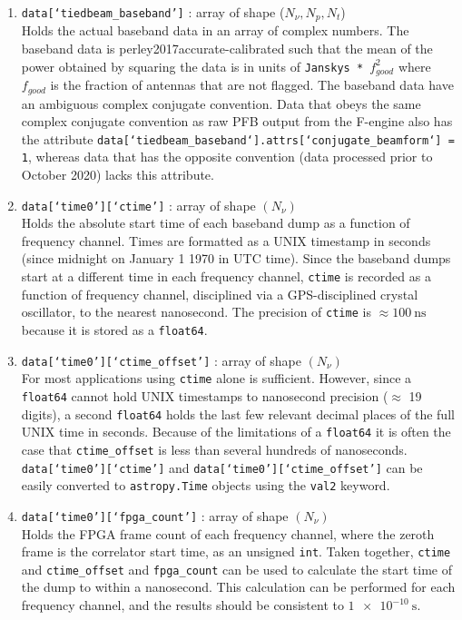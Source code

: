 \begin{enumerate}
    \item \texttt{data[`tiedbeam\_baseband']} : array of shape ($N_{\nu},N_{p}, N_t$)\\ 
            Holds the actual baseband data in an array of complex numbers. The baseband data is perley2017accurate-calibrated such that the mean of the power obtained by squaring the data is in units of \texttt{Janskys * $f_{good}^2$} where $f_{good}$ is the fraction of antennas that are not flagged. The baseband data have an ambiguous complex conjugate convention. Data that obeys the same complex conjugate convention as raw PFB output from the F-engine also has the attribute \texttt{data[`tiedbeam\_baseband`].attrs[`conjugate\_beamform`] = 1}, whereas data that has the opposite convention (data processed prior to October 2020) lacks this attribute.

    \item \texttt{data[`time0'][`ctime']} : array of shape $(N_{\nu})$ \\
        Holds the absolute start time of each baseband dump as a function of frequency channel. Times are formatted as a UNIX timestamp in seconds (since midnight on January 1 1970 in UTC time). Since the baseband dumps start at a different time in each frequency channel, \texttt{ctime} is recorded as a function of frequency channel, disciplined via a GPS-disciplined crystal oscillator, to the nearest nanosecond. The precision of \texttt{ctime} is $\approx \SI{100}{\ns}$ because it is stored as a \texttt{float64}.

    \item \texttt{data[`time0'][`ctime\_offset']} : array of shape $(N_{\nu})$ \\ 
        For most applications using \texttt{ctime} alone is sufficient. However, since a \texttt{float64} cannot hold UNIX timestamps to nanosecond precision ($\approx$ 19 digits), a second \texttt{float64} holds the last few relevant decimal places of the full UNIX time in seconds. Because of the limitations of a \texttt{float64} it is often the case that \texttt{ctime\_offset} is less than several hundreds of nanoseconds.  \texttt{data[`time0'][`ctime']} and
        \texttt{data[`time0'][`ctime\_offset']} can be easily converted to \texttt{astropy.Time} objects using the \texttt{val2} keyword.

    \item \texttt{data[`time0'][`fpga\_count']} : array of shape $(N_{\nu})$ \\
        Holds the FPGA frame count of each frequency channel, where the zeroth frame is the correlator start time, as an unsigned \texttt{int}. Taken together, \texttt{ctime} and \texttt{ctime\_offset} and \texttt{fpga\_count} can be used to calculate the start time of the dump to within a nanosecond. This calculation can be performed for each frequency channel, and the results should be consistent to $\SI{1e-10}{\second}$. 


\end{enumerate}
